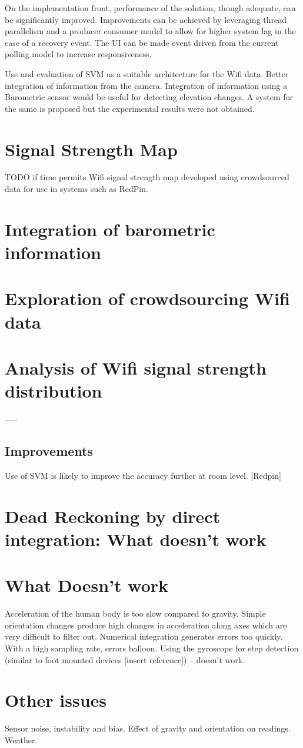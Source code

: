On the implementation front, performance of the solution, though 
adequate, can be significantly improved.
Improvements can be achieved by leveraging thread parallelism and a 
producer consumer model to allow for higher system lag in the case of 
a recovery event. The UI can be made event driven from the current 
polling model to increase responsiveness.


Use and evaluation of SVM as a suitable architecture for the Wifi data.
Better integration of information from the camera.
Integration of information using a Barometric sensor would be useful for detecting elevation changes. A system for the same is proposed but the experimental results were not obtained. 


\section{Signal Strength Map}

TODO if time permits
Wifi signal strength map developed using crowdsourced data for use in systems such as RedPin.


\section{Integration of barometric information}

\section{Exploration of crowdsourcing Wifi data}

\section{Analysis of Wifi signal strength distribution}

-----
\subsection{Improvements}
Use of SVM is likely to improve the accuracy further at room level. [Redpin]


\section{Dead Reckoning by direct integration: What doesn't work}
\section{What Doesn't work}
Acceleration of the human body is too slow compared to gravity. Simple orientation changes produce high changes in acceleration along axes which are very difficult to filter out.
Numerical integration generates errors too quickly. With a high sampling rate, errors balloon.
Using the gyroscope for step detection (similar to foot mounted devices [insert reference]) – doesn’t work.


\section{Other issues}
Sensor noise, instability and bias. Effect of gravity and orientation on readings. Weather.


